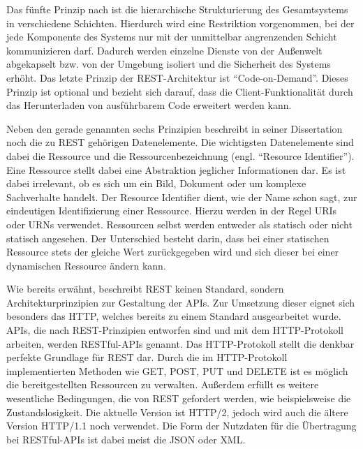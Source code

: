 Das fünfte Prinzip nach \citeauthor{MS-Fielding.} ist die hierarchische Strukturierung des Gesamtsystems in verschiedene Schichten. 
Hierdurch wird eine Restriktion vorgenommen, bei der jede Komponente des Systems nur mit der unmittelbar angrenzenden Schicht kommunizieren darf. 
Dadurch werden einzelne Dienste von der Außenwelt abgekapselt bzw. von der Umgebung isoliert und die Sicherheit des Systems erhöht. 
Das letzte Prinzip der \ac{REST}-Architektur ist \enquote{Code-on-Demand}.
Dieses Prinzip ist optional und bezieht sich darauf, dass die Client-Funktionalität durch das Herunterladen von ausführbarem Code erweitert werden kann. 

Neben den gerade genannten sechs Prinzipien beschreibt \citeauthor{MS-Fielding.} in seiner Dissertation noch die zu \ac{REST} gehörigen Datenelemente. 
Die wichtigsten Datenelemente sind dabei die Ressource und die Ressourcenbezeichnung (engl. \enquote{Resource Identifier}). 
Eine Ressource stellt dabei eine Abstraktion jeglicher Informationen dar. 
Es ist dabei irrelevant, ob es sich um ein Bild, Dokument oder um komplexe Sachverhalte handelt. 
Der Resource Identifier dient, wie der Name schon sagt, zur eindeutigen Identifizierung einer Ressource. 
Hierzu werden in der Regel \acp{URI} oder \acp{URN} verwendet. 
Ressourcen selbst werden entweder als statisch oder nicht statisch angesehen.
Der Unterschied besteht darin, dass bei einer statischen Ressource stets der gleiche Wert zurückgegeben wird und sich dieser bei einer dynamischen Ressource ändern kann.\autocite[Vgl.][S. 86-90]{MS-Fielding.}

Wie bereits erwähnt, beschreibt \ac{REST} keinen Standard, sondern Architekturprinzipien zur Gestaltung der \acp{API}. 
Zur Umsetzung dieser eignet sich besonders das \ac{HTTP}, welches bereits zu einem Standard ausgearbeitet wurde. 
\acp{API}, die nach \ac{REST}-Prinzipien entworfen sind und mit dem \ac{HTTP}-Protokoll arbeiten, werden \ac{REST}ful-\acp{API} genannt.\autocite[Vgl.][S. 180]{MS-Wolff.2016}
Das \ac{HTTP}-Protokoll stellt die denkbar perfekte Grundlage für \ac{REST} dar. 
Durch die im \ac{HTTP}-Protokoll implementierten Methoden wie GET, POST, PUT und DELETE ist es möglich die bereitgestellten Ressourcen zu verwalten.
Außerdem erfüllt es weitere wesentliche Bedingungen, die von \ac{REST} gefordert werden, wie beispielsweise die Zustandslosigkeit. 
Die aktuelle Version ist \ac{HTTP}/2\autocite{MS-Belshe.2015}, jedoch wird auch die ältere Version \ac{HTTP}/1.1\autocite{MS-Fielding.1999} noch verwendet. 
Die Form der Nutzdaten für die Übertragung bei \ac{REST}ful-\acp{API} ist dabei meist die \ac{JSON} oder \ac{XML}.\autocite[Vgl.][S. 97]{MS-Tilkov.2015} 
